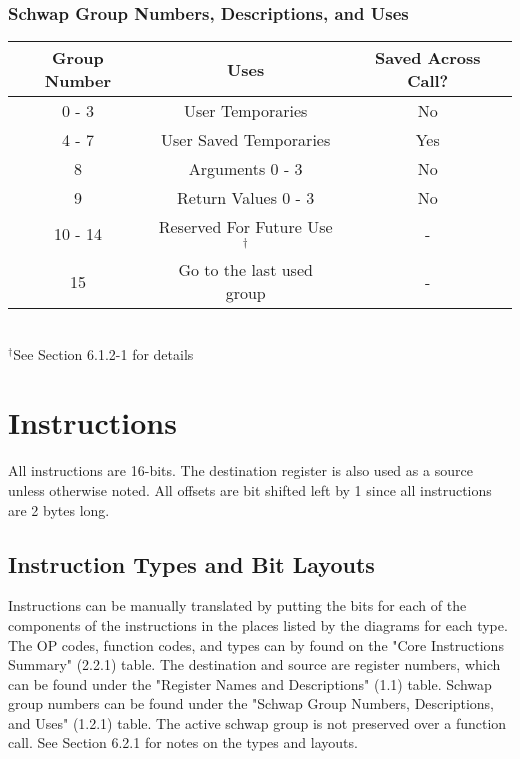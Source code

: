 \documentclass{article}
\begin{document}
		\subsubsection{Schwap Group Numbers, Descriptions, and Uses}
			\begin{center}
				\begin{tabular}{| c | c | c |}
					\hline
				    	Group Number & Uses                      & Saved Across Call? \\ \hline
					    0 - 3        & User Temporaries          & No \\ \hline
					    4 - 7        & User Saved Temporaries    & Yes\\ \hline
					    8            & Arguments 0 - 3           & No \\ \hline
					    9            & Return Values 0 - 3       & No \\ \hline
					    10 - 14      & Reserved For Future Use$^\dagger$ & -  \\ \hline
					    15           & Go to the last used group & -  \\
					\hline
				\end{tabular} \\
				$^\dagger$See Section 6.1.2-1 for details
			\end{center}
\newpage
\section{Instructions}
	All instructions are 16-bits.  The destination register is also used as a source unless otherwise noted.  All offsets are bit shifted left by 1 since all instructions are 2 bytes long.
	\subsection{Instruction Types and Bit Layouts}
		Instructions can be manually translated by putting the bits for each of the components of the instructions in the places listed by the diagrams for each type.  The OP codes, function codes, and types can by found on the "Core Instructions Summary" (2.2.1) table.  The destination and source are register numbers, which can be found under the "Register Names and Descriptions" (1.1) table.  Schwap group numbers can be found under the "Schwap Group Numbers, Descriptions, and Uses" (1.2.1) table.  The active schwap group is not preserved over a function call.  See Section 6.2.1 for notes on the types and layouts.
\end{document}
